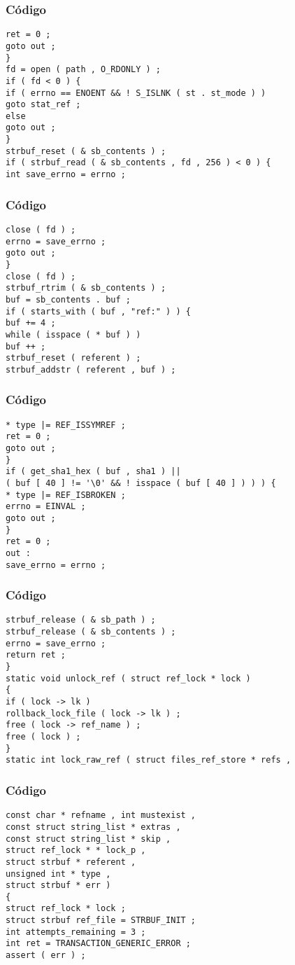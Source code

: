 \documentclass{beamer}
\begin{document}
\begin{frame}[fragile]
\frametitle{C\'odigo}
\begin{verbatim}
ret = 0 ; 
goto out ; 
} 
fd = open ( path , O_RDONLY ) ; 
if ( fd < 0 ) { 
if ( errno == ENOENT && ! S_ISLNK ( st . st_mode ) ) 
goto stat_ref ; 
else 
goto out ; 
} 
strbuf_reset ( & sb_contents ) ; 
if ( strbuf_read ( & sb_contents , fd , 256 ) < 0 ) { 
int save_errno = errno ; 
\end{verbatim}
\end{frame}
\begin{frame}[fragile]
\frametitle{C\'odigo}
\begin{verbatim}
close ( fd ) ; 
errno = save_errno ; 
goto out ; 
} 
close ( fd ) ; 
strbuf_rtrim ( & sb_contents ) ; 
buf = sb_contents . buf ; 
if ( starts_with ( buf , "ref:" ) ) { 
buf += 4 ; 
while ( isspace ( * buf ) ) 
buf ++ ; 
strbuf_reset ( referent ) ; 
strbuf_addstr ( referent , buf ) ; 
\end{verbatim}
\end{frame}
\begin{frame}[fragile]
\frametitle{C\'odigo}
\begin{verbatim}
* type |= REF_ISSYMREF ; 
ret = 0 ; 
goto out ; 
} 
if ( get_sha1_hex ( buf , sha1 ) || 
( buf [ 40 ] != '\0' && ! isspace ( buf [ 40 ] ) ) ) { 
* type |= REF_ISBROKEN ; 
errno = EINVAL ; 
goto out ; 
} 
ret = 0 ; 
out : 
save_errno = errno ; 
\end{verbatim}
\end{frame}
\begin{frame}[fragile]
\frametitle{C\'odigo}
\begin{verbatim}
strbuf_release ( & sb_path ) ; 
strbuf_release ( & sb_contents ) ; 
errno = save_errno ; 
return ret ; 
} 
static void unlock_ref ( struct ref_lock * lock ) 
{ 
if ( lock -> lk ) 
rollback_lock_file ( lock -> lk ) ; 
free ( lock -> ref_name ) ; 
free ( lock ) ; 
} 
static int lock_raw_ref ( struct files_ref_store * refs , 
\end{verbatim}
\end{frame}
\begin{frame}[fragile]
\frametitle{C\'odigo}
\begin{verbatim}
const char * refname , int mustexist , 
const struct string_list * extras , 
const struct string_list * skip , 
struct ref_lock * * lock_p , 
struct strbuf * referent , 
unsigned int * type , 
struct strbuf * err ) 
{ 
struct ref_lock * lock ; 
struct strbuf ref_file = STRBUF_INIT ; 
int attempts_remaining = 3 ; 
int ret = TRANSACTION_GENERIC_ERROR ; 
assert ( err ) ; 
\end{verbatim}
\end{frame}
\end{document}

